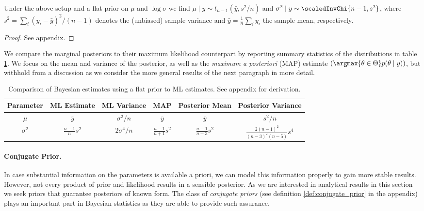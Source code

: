 \begin{proposition}\label{prop:posterior_uniform}
  Under the above setup and a flat prior on $\mu$ and $\log \sigma$ we find $\mu \mid y \sim t_{n-1}(\bar{y}, s^2/n)$ and $\sigma^2 \mid y \sim \scaledInvChi{n-1, s^2}$, where $s^2 = \sum_i (y_i - \bar{y})^2 / (n-1)$ denotes the (unbiased) sample variance and $\bar{y} = \frac{1}{n} \sum_i y_i$ the sample mean, respectively.
\end{proposition}
\begin{proof}
See appendix.
\end{proof}

We compare the marginal posteriors to their maximum likelihood counterpart by reporting summary statistics of the distributions in table \ref{tab:comp_uniform_bay_ml}.
We focus on the mean and variance of the posterior, as well as the \emph{maximum a posteriori} (MAP) estimate $\left(\argmax{\theta \in \Theta} p(\theta \mid y)\right)$, but withhold from a discussion as we consider the more general results of the next paragraph in more detail.

\begin{table}[ht]
\centering
\def\arraystretch{1.3}
{\small
 \begin{tabular}{c | c c c c c}
 Parameter & ML Estimate & ML Variance & MAP & Posterior Mean & Posterior Variance\\[0.5ex]
 \hline
 $\mu$ & $\bar{y}$ & $\sigma^2/n$ & $\bar{y}$ & $\bar{y}$ & $s^2 / n$\\
 $\sigma^2$ & $\frac{n-1}{n} s^2$ & $2 \sigma^4 /n$ & $\frac{n-1}{n+1} s^2$ & $\frac{n-1}{n-3} s^2$ & $\frac{2 (n-1)^2}{(n-3)^2 (n-5)} s^4$\\
 \end{tabular}
 }
\caption{\small{Comparison of Bayesian estimates using a flat prior to ML estimates. See appendix for derivation.}}
\label{tab:comp_uniform_bay_ml}
\end{table}

\vspace{-15pt}
\paragraph{Conjugate Prior.}
In case substantial information on the parameters is available a priori, we can model this information properly to gain more stable results.
However, not every product of prior and likelihood results in a sensible posterior.
As we are interested in analytical results in this section we seek priors that guarantee posteriors of known form.
The class of \emph{conjugate priors} (see definition \ref{def:conjugate_prior} in the appendix) plays an important part in Bayesian statistics as they are able to provide such assurance.

